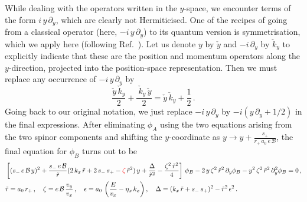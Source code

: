 \documentclass[aps,prb, onecolumn, nofootinbib, citeautoscript,10pt]{revtex4-2}
\newcommand{\red}[1]{{\color{red}#1}}
\def \nn{\nonumber \\}
\begin{document}
\begin{widetext}
While dealing with the operators written in the $y$-space, we encounter terms of the form $i\, y\, \partial_y $, which are clearly not Hermiticised. One of the recipes of going from a classical operator (here, $ -i\, y\, \partial_y$) to its quantum version is symmetrisation, which we apply here (following Ref.~\cite{strained-dirac-franz}). Let us denote $y$ by $\check y$ and $-i\, \partial_y$ by $\check k_y$ to explicitly indicate that these are the position and momentum operators along the $y$-direction, projected into the position-space representation. Then we must replace any occurrence of $ -i\, y \,\partial_y $ by
$$ \frac{\check{y} \,\check{k}_y}{2}  +   \frac{\ \check{k}_y \, \check{y} }{2} = \check{y} \,\check{k}_y + \frac{1}{2} \,.$$
Going back to our original notation, we just replace $ -i\, y \,\partial_y $ by $-i\left ( y\,\partial_y + 1/2 \right)$ in the final expressions. After eliminating $\phi_A$ using the two equations arising from the two spinor components and shifting the $y$-coordinate as $ y\rightarrow y + 
\frac{s_+}{r_+ \,a_0\,  e\, {\mathcal B}}$, the final equation for $\phi_B$ turns out to be
\begin{align}
\label{eqdiffea}
& \left[(s_{-}\,e \, {\mathcal B}\,y)^2 + \frac{s_{-} \,e \, {\mathcal B}}{\tilde{r}}(2\,k_x\,\tilde{r}+2\,s_{-}\,s_+
-\red{\zeta}\,\tilde{r}^2)\,y+\frac{\Delta}{\tilde{r}^2}-\frac{\zeta^2\,\tilde{r}^2}{4} \right] \, \phi_B 
-2 \,y \, \zeta^2 \, \tilde{r}^2 \, \partial_y \phi_B-y^2 \, \zeta^2 \, \tilde{r}^2 \, \partial^2_y \phi_B = 0\,,
\nn & \tilde{r} = a_0 \, r_+ \,, \quad \zeta =  e \, {\mathcal B} \, \frac{v_y}{v_x} \,, \quad
\epsilon = a_0 \, \left( \frac{E}{v_x}- \eta_x \, k_x \right), \quad
\Delta = (k_x \, \tilde r+ s_{-} \, s_+ )^2-\tilde r^2 \, \epsilon^2 \,.
\end{align}

\end{widetext}
\end{document}
